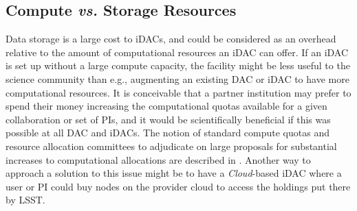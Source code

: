 \subsection{Compute {\it vs.} Storage Resources}
Data storage is a large cost to iDACs, and could be considered as an overhead relative to the amount of computational resources an iDAC can offer. If an iDAC is set up without a large compute capacity, the facility might be less useful to the science community than e.g., augmenting an existing DAC or iDAC to have more computational resources. It is conceivable that a partner institution may prefer to spend their money increasing the computational quotas available for a given collaboration or set of PIs, and it would be scientifically beneficial if this was possible at all DAC and iDACs. The notion of standard compute quotas and resource allocation committees to adjudicate on large proposals for substantial increases to computational allocations are described in . Another way to approach a solution to this issue might be to have a \emph{Cloud}-based iDAC where a user or PI could buy nodes on the provider cloud to access the holdings put there by LSST.
